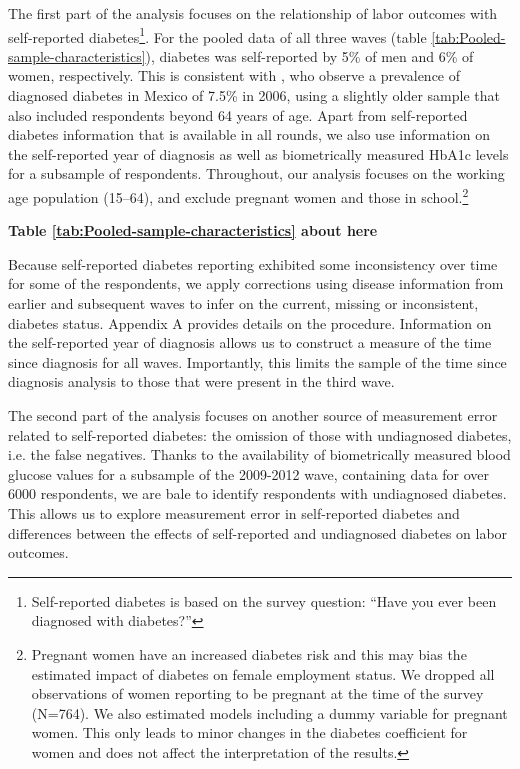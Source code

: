 \documentclass[12pt,english]{article}
\begin{document}
The first part of the analysis focuses on the relationship of labor outcomes with self-reported diabetes\footnote{Self-reported diabetes is based on the survey question: “Have you ever been diagnosed with diabetes?”}. For the pooled data of all three waves (table \ref{tab:Pooled-sample-characteristics}), diabetes was self-reported by 5\% of men and 6\% of women, respectively. This is consistent with \textcite{Barquera2013}, who observe a prevalence of diagnosed diabetes in Mexico of 7.5\% in 2006, using a slightly older sample that also included respondents beyond 64 years of age. Apart from self-reported diabetes information that is available in all rounds, we also use information on the self-reported year of diagnosis as well as biometrically measured \ac{HbA1c} levels for a subsample of respondents. Throughout, our analysis focuses on the working age population (15–64), and exclude pregnant women and those in school.\footnote{Pregnant women have an increased diabetes risk and this may bias the estimated impact of diabetes on female employment status. We dropped all observations of women reporting to be pregnant at the time of the survey (N=764). We also estimated models including a dummy variable for pregnant women. This only leads to minor changes in the diabetes coefficient for women and does not affect the interpretation of the results.}

\begin{center}
	\textbf{Table \ref{tab:Pooled-sample-characteristics} about here}
\end{center}

Because self-reported diabetes reporting exhibited some inconsistency over time for some of the respondents, we apply corrections using disease information from earlier and subsequent waves to infer on the current, missing or inconsistent, diabetes status. Appendix A provides details on the procedure. Information on the self-reported year of diagnosis allows us to construct a measure of the time since diagnosis for all waves. Importantly, this limits the sample of the time since diagnosis analysis to those that were present in the third wave. 

The second part of the analysis focuses on another source of measurement error related to self-reported diabetes: the omission of those with undiagnosed diabetes, i.e. the false negatives. Thanks to the availability of biometrically measured blood glucose values for a subsample of the 2009-2012 wave, containing data for over 6000 respondents, we are bale to identify respondents with undiagnosed diabetes. This allows us to explore measurement error in self-reported diabetes and differences between the effects of self-reported and undiagnosed diabetes on labor outcomes.
\end{document}
